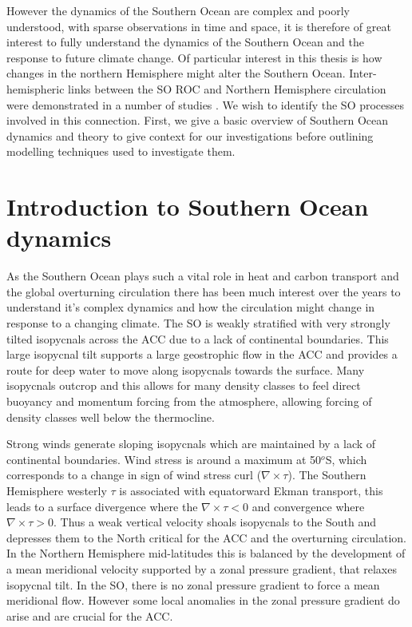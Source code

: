 However the dynamics of the Southern Ocean are complex and poorly understood, with sparse observations in time and space, it is therefore of great interest to fully understand the dynamics of the Southern Ocean and the response to future climate change. Of particular interest in this thesis is how changes in the northern Hemisphere might alter the Southern Ocean. Inter-hemispheric links between the SO ROC and Northern Hemisphere circulation were demonstrated in a number of studies \citep{Gnanadesikan2000,Wolfe2011}. We wish to identify the SO processes involved in this connection. First, we give a basic overview of Southern Ocean dynamics and theory to give context for our investigations before outlining modelling techniques used to investigate them. 


\section{Introduction to Southern Ocean dynamics}

As the Southern Ocean plays such a vital role in heat and carbon transport and the global overturning circulation there has been much interest over the years to understand it's complex dynamics and how the circulation might change in response to a changing climate. The SO is weakly stratified with very strongly tilted isopycnals across the ACC due to a lack of continental boundaries. This large isopycnal tilt supports a large geostrophic flow in the ACC and provides a route for deep water to move along isopycnals towards the surface. Many isopycnals outcrop and this allows for many density classes to feel direct buoyancy and momentum forcing from the atmosphere, allowing forcing of density classes well below the thermocline. 

Strong winds generate sloping isopycnals which are maintained by a lack of continental boundaries. Wind stress is around a maximum at 50$^o$S, which corresponds to a change in sign of wind stress curl ($\nabla \times \tau$). The Southern Hemisphere westerly $\tau$ is associated with equatorward Ekman transport, this leads to a surface divergence where the $\nabla \times \tau < 0$ and convergence where $\nabla \times \tau > 0$. Thus a weak vertical velocity shoals isopycnals to the South and depresses them to the North critical for the ACC and the overturning circulation. In the Northern Hemisphere mid-latitudes this is balanced by the development of a mean meridional velocity supported by a zonal pressure gradient, that relaxes isopycnal tilt. In the SO, there is no zonal pressure gradient to force a mean meridional flow. However some local anomalies in the zonal pressure gradient do arise and are crucial for  the ACC.

